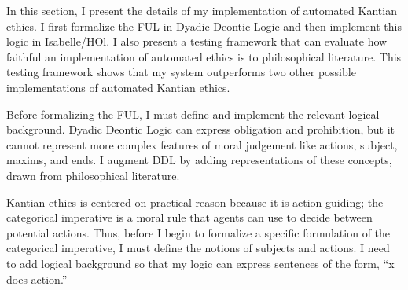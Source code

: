 %
\begin{isabellebody}%
%
%
\isadelimtheory
%
\endisadelimtheory
%
\isatagtheory
%
\endisatagtheory
{\isafoldtheory}%
%
\isadelimtheory
%
\endisadelimtheory
%
\isadelimdocument
%
\endisadelimdocument
%
\isatagdocument
%
\isamarkuptrue%
%
\endisatagdocument
{\isafolddocument}%
%
\isadelimdocument
%
\endisadelimdocument
%
\begin{isamarkuptext}%
In this section, I present the details of my implementation of automated Kantian ethics. I first 
formalize the FUL in Dyadic Deontic Logic and then implement this logic in Isabelle/HOl. I 
also present a testing framework that can evaluate how faithful an implementation
of automated ethics is to philosophical literature. This testing framework shows that my system outperforms
two other possible implementations of automated Kantian ethics.%
\end{isamarkuptext}\isamarkuptrue%
%
\isadelimdocument
%
\endisadelimdocument
%
\isatagdocument
%
\isamarkuptrue%
%
\endisatagdocument
{\isafolddocument}%
%
\isadelimdocument
%
\endisadelimdocument
%
\begin{isamarkuptext}%
Before formalizing the FUL, I must define and implement the relevant logical background. Dyadic
Deontic Logic can express obligation and prohibition, but it cannot represent more complex features of 
moral judgement like actions, subject, maxims, and ends. I augment DDL by adding representations 
of these concepts, drawn from philosophical literature.%
\end{isamarkuptext}\isamarkuptrue%
%
\isadelimdocument
%
\endisadelimdocument
%
\isatagdocument
%
\isamarkuptrue%
%
\endisatagdocument
{\isafolddocument}%
%
\isadelimdocument
%
\endisadelimdocument
%
\begin{isamarkuptext}%
Kantian ethics is centered on practical reason because it is action-guiding; the categorical
imperative is a moral rule that agents can use to decide between potential actions. Thus, before I 
begin to formalize a specific formulation of the categorical imperative, I must define the notions of 
subjects and actions. I need to add logical background so that my logic can express sentences 
of the form, ``x does action.''%
\end{isamarkuptext}\isamarkuptrue%
\isamarkupfalse%

\end{isabellebody}
